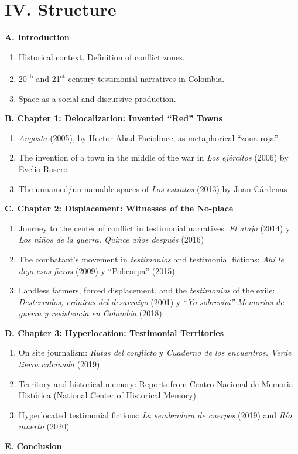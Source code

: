 \documentclass[
  11pt,
,
onecolumn,
openany
]{book}
\begin{document}
\hypertarget{iv.-structure}{%
\chapter{IV. Structure}\label{iv.-structure}}

\textbf{A. Introduction}

\begin{enumerate}
\def\labelenumi{\arabic{enumi}.}
\item
  Historical context. Definition of conflict zones.
\item
  20\textsuperscript{th} and 21\textsuperscript{st} century testimonial
  narratives in Colombia.
\item
  Space as a social and discursive production.
\end{enumerate}

\textbf{B. Chapter 1: Delocalization: Invented ``Red'' Towns}

\begin{enumerate}
\def\labelenumi{\arabic{enumi}.}
\item
  \emph{Angosta} (2005), by Hector Abad Faciolince, as metaphorical ``zona
  roja''
\item
  The invention of a town in the middle of the war in \emph{Los ejércitos}
  (2006) by Evelio Rosero
\item
  The unnamed/un-namable spaces of \emph{Los estratos} (2013) by Juan
  Cárdenas~
\end{enumerate}

\textbf{C. Chapter 2: Displacement: Witnesses of the No-place}

\begin{enumerate}
\def\labelenumi{\arabic{enumi}.}
\item
  Journey to the center of conflict in testimonial narratives: \emph{El atajo}
  (2014) y \emph{Los niños de la guerra. Quince años después} (2016)~
\item
  The combatant's movement in \emph{testimonios} and testimonial fictions:
  \emph{Ahí le dejo esos fieros} (2009) y ``Policarpa'' (2015)
\item
  Landless farmers, forced displacement, and the \emph{testimonios} of the
  exile: \emph{Desterrados, crónicas del desarraigo} (2001) y ``\emph{Yo
  sobreviví'' Memorias de guerra y resistencia en Colombia} (2018)~
\end{enumerate}

\textbf{D. Chapter 3: Hyperlocation: Testimonial Territories}

\begin{enumerate}
\def\labelenumi{\arabic{enumi}.}
\item
  On site journalism: \emph{Rutas del conflicto} y \emph{Cuaderno de los
  encuentros. Verde tierra calcinada} (2019)\emph{~}
\item
  Territory and historical memory: Reports from Centro Nacional de Memoria
  Histórica (National Center of Historical Memory)
\item
  Hyperlocated testimonial fictions: \emph{La sembradora de cuerpos} (2019)
  and \emph{Río muerto} (2020)
\end{enumerate}

\textbf{E. Conclusion}
\end{document}
